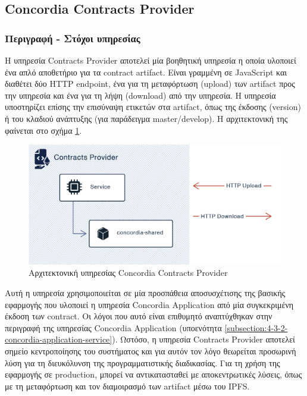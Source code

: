 \subsection{Concordia Contracts Provider} \label{subsection:4-3-5-concordia-contracts-provider-service}

\subsubsection{Περιγραφή - Στόχοι υπηρεσίας}

Η υπηρεσία Contracts Provider αποτελεί μία βοηθητική υπηρεσία η οποία υλοποιεί ένα απλό αποθετήριο για τα \textenglish{contract artifact}. Είναι γραμμένη σε JavaScript και διαθέτει δύο HTTP \textenglish{endpoint}, ένα για τη μεταφόρτωση (upload) των artifact προς την υπηρεσία και ένα για τη λήψη (download) από την υπηρεσία. Η υπηρεσία υποστηρίζει επίσης την επισύναψη ετικετών στα artifact, όπως της έκδοσης (version) ή του κλαδιού ανάπτυξης (για παράδειγμα \textenglish{master/develop}). Η αρχιτεκτονική της φαίνεται στο σχήμα \ref{figure:4-3-concordia-contracts-provider-architecture}.

\vspace{.5\baselineskip}

\begin{figure}[H]
    \centering
    \includegraphics[width=.75\textwidth]{assets/figures/chapter-4/4.3.architecture-4.3.5.concordia-contracts-provider-architecture}
    \caption{Αρχιτεκτονική υπηρεσίας Concordia Contracts Provider}
    \label{figure:4-3-concordia-contracts-provider-architecture}
\end{figure}

Αυτή η υπηρεσία χρησιμοποιείται σε μία προσπάθεια αποσυσχέτισης της βασικής εφαρμογής που υλοποιεί η υπηρεσία Concordia Application από μία συγκεκριμένη έκδοση των contract. Οι λόγοι που αυτό είναι επιθυμητό αναπτύχθηκαν στην περιγραφή της υπηρεσίας Concordia \textenglish{Application} (υποενότητα \ref{subsection:4-3-2-concordia-application-service}). Ωστόσο, η υπηρεσία Contracts Provider αποτελεί σημείο κεντροποίησης του συστήματος και για αυτόν τον λόγο θεωρείται προσωρινή λύση για τη διευκόλυνση της προγραμματιστικής διαδικασίας. Για τη χρήση της εφαρμογής σε production, μπορεί να αντικατασταθεί με αποκεντρωτικές λύσεις, όπως με τη μεταφόρτωση και τον διαμοιρασμό των artifact μέσω του IPFS.

